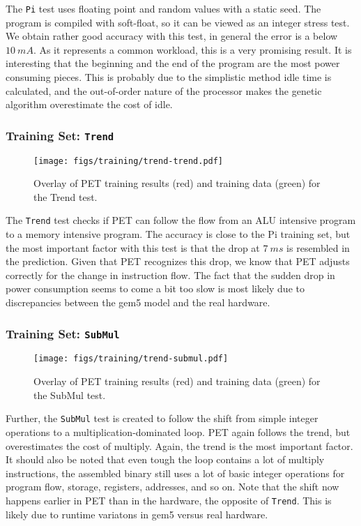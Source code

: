 The \texttt{Pi} test uses floating point and random values with a static seed. The
program is compiled with soft-float, so it can be viewed as an integer stress
test. We obtain rather good accuracy with this test, in general the error is a
below $10~mA$. As it represents a common workload, this is a very promising
result. It is interesting that the beginning and the end of the program are the
most power consuming pieces. This is probably due to the simplistic method idle
time is calculated, and the out-of-order nature of the processor makes the
genetic algorithm overestimate the cost of idle.

\newpage

\subsubsection{Training Set: \texttt{Trend}}
\begin{figure}[htb]
    \centering
    \texttt{[image: figs/training/trend-trend.pdf]}
    \caption{Overlay of PET training results (red) and training data (green) for the Trend test.}
    \label{fig:trend-training}
\end{figure}

The \texttt{Trend} test checks if PET can follow the flow from an ALU intensive
program to a memory intensive program. The accuracy is close to the Pi training
set, but the most important factor with this test is that the drop at $7~ms$ is
resembled in the prediction. Given that PET recognizes this drop, we know that
PET adjusts correctly for the change in instruction flow. The fact that the
sudden drop in power consumption seems to come a bit too slow is most likely due
to discrepancies between the gem5 model and the real hardware.

\newpage

\subsubsection{Training Set: \texttt{SubMul}}
\begin{figure}[htb]
    \centering
    \texttt{[image: figs/training/trend-submul.pdf]}
    \caption{Overlay of PET training results (red) and training data (green) for the SubMul test.}
    \label{fig:submul-training}
\end{figure}

Further, the \texttt{SubMul} test is created to follow the shift from simple
integer operations to a multiplication-dominated loop. PET again follows the
trend, but overestimates the cost of multiply. Again, the trend is the most
important factor. It should also be noted that even tough the loop contains a
lot of multiply instructions, the assembled binary still uses a lot of basic
integer operations for program flow, storage, registers, addresses, and so on.
Note that the shift now happens earlier in PET than in the hardware, the
opposite of \texttt{Trend}. This is likely due to runtime variatons in gem5
versus real hardware.

